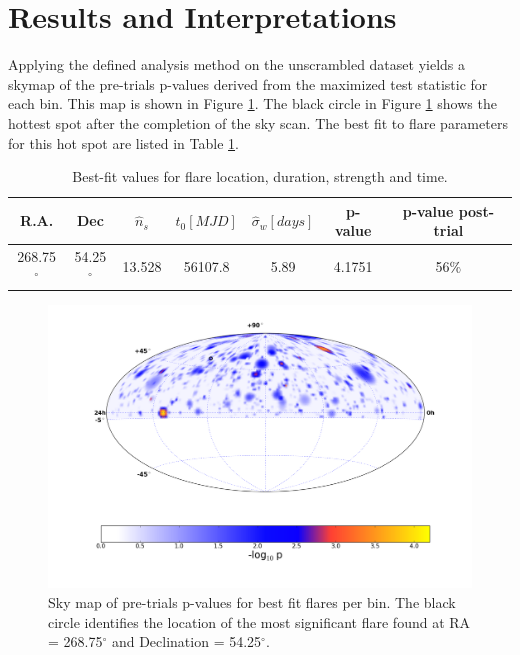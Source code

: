 \documentclass[manuscript]{aastex}
\begin{document}
\section{Results and Interpretations}
Applying the defined analysis method on the unscrambled dataset yields a skymap of the pre-trials p-values derived from the maximized test statistic for each bin. This map is shown in Figure \ref{fig:RealSkyMap}. The black circle in Figure \ref{fig:RealSkyMap} shows the hottest spot after the completion of the sky scan. The best fit to flare parameters for this hot spot are listed in Table \ref{tab:best_fit_flare}. 
\begin{table}[h]
\begin{center}
\begin{tabular}{ccccccc}
  \toprule
R.A. &  Dec & $\hat{n}_s$ & $\hat{t}_0 [MJD]$ & $\hat{\sigma}_w [days]$ & p-value & p-value post-trial \\
\midrule
268.75$^{\circ}$ & 54.25$^{\circ}$ & 13.528 & 56107.8 & 5.89 & 4.1751 & 56$\%$\\
\end{tabular}
\end{center}
\caption[Best-fit signal parameters]{Best-fit values for flare location, duration, strength and time.\label{tab:best_fit_flare}}
\end{table}

\begin{figure}[ht]
  \begin{center}
    \includegraphics[width=1.0\textwidth,keepaspectratio]{plots/RealResultSkyMap.png}
  \end{center}
  \caption[Results Sky Map]{Sky map of pre-trials p-values for best fit flares per bin. The black circle identifies the location of the most significant flare found at RA = 268.75$^\circ$ and Declination = 54.25$^\circ$.}
  \label{fig:RealSkyMap}
\end{figure}
\end{document}
